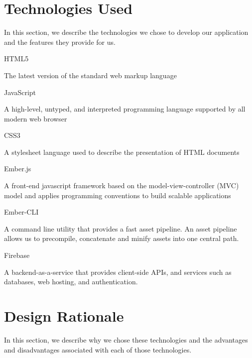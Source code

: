 \section{Technologies Used}
In this section, we describe the technologies we chose to develop our application and the features they provide for us.

\begin{itemized}
\item HTML5 \par The latest version of the standard web markup language
\item JavaScript \par A high-level, untyped, and interpreted programming  language supported by all modern web browser
\item CSS3 \par A stylesheet language used to describe the presentation of HTML documents
\item Ember.js \par A front-end javascript framework based on the model-view-controller (MVC) model and applies programming conventions to build scalable applications
\item Ember-CLI \par A command line utility that provides a fast asset pipeline. An asset pipeline allows us to precompile, concatenate and minify assets into one central path.\cite{embercli}
\item  Firebase \par A backend-as-a-service that provides client-side APIs, and services such as databases, web hosting, and authentication.
\end{itemized}

\section{Design Rationale}
In this section, we describe why we chose these technologies and the advantages and disadvantages associated with each of those technologies. 
